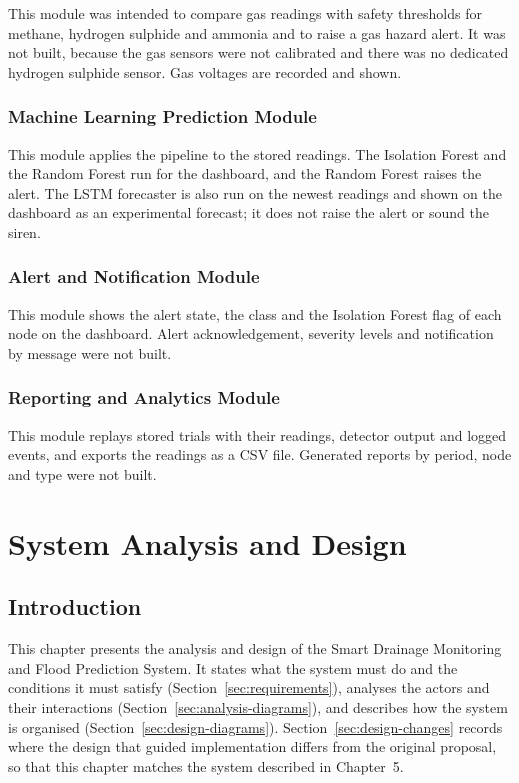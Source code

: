 \documentclass[12pt, a4paper]{article}
\begin{document}
This module was intended to compare gas readings with safety thresholds for methane, hydrogen sulphide and ammonia and to raise a gas hazard alert. It was not built, because the gas sensors were not calibrated and there was no dedicated hydrogen sulphide sensor. Gas voltages are recorded and shown.

\subsubsection{Machine Learning Prediction Module}

This module applies the pipeline to the stored readings. The Isolation Forest and the Random Forest run for the dashboard, and the Random Forest raises the alert. The LSTM forecaster is also run on the newest readings and shown on the dashboard as an experimental forecast; it does not raise the alert or sound the siren.

\subsubsection{Alert and Notification Module}

This module shows the alert state, the class and the Isolation Forest flag of each node on the dashboard. Alert acknowledgement, severity levels and notification by message were not built.

\subsubsection{Reporting and Analytics Module}

This module replays stored trials with their readings, detector output and logged events, and exports the readings as a CSV file. Generated reports by period, node and type were not built.

\clearpage
\section{System Analysis and Design}
\label{sec:ch4}

\subsection{Introduction}

This chapter presents the analysis and design of the Smart Drainage Monitoring and Flood Prediction System. It states what the system must do and the conditions it must satisfy (Section~\ref{sec:requirements}), analyses the actors and their interactions (Section~\ref{sec:analysis-diagrams}), and describes how the system is organised (Section~\ref{sec:design-diagrams}). Section~\ref{sec:design-changes} records where the design that guided implementation differs from the original proposal, so that this chapter matches the system described in Chapter~5.
\end{document}
